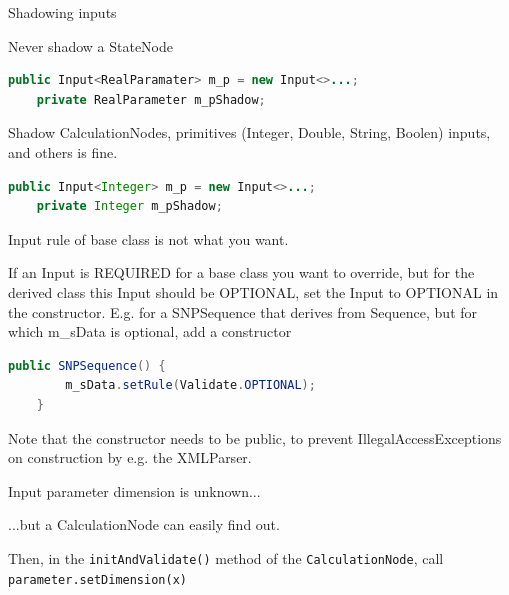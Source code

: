 \documentclass{beamer}
\theoremstyle{definition}
\begin{document}
\begin{frame}[containsverbatim]{Shadowing inputs}

Never shadow a StateNode

\begin{lstlisting}[language=java]
    public Input<RealParamater> m_p = new Input<>...;
    private RealParameter m_pShadow;
\end{lstlisting}


Shadow CalculationNodes, 
primitives (Integer, Double, String, Boolen) inputs, 
and others is fine.


\begin{lstlisting}[language=java]
    public Input<Integer> m_p = new Input<>...;
    private Integer m_pShadow;
\end{lstlisting}


\end{frame}
\fi

\begin{frame}[containsverbatim]{Input rule of base class is not what you want.}

If an Input is REQUIRED for a base class you want to override, but for the derived
class this Input should be OPTIONAL, set the Input to OPTIONAL in the constructor.
E.g. for a SNPSequence that derives from Sequence, but for which m\_sData is optional,
add a constructor

{\color{blue}\begin{lstlisting}[language=java]
	public SNPSequence() {
		m_sData.setRule(Validate.OPTIONAL);
	}
\end{lstlisting}}
Note that the constructor needs to be public, to prevent IllegalAccessExceptions
on construction by e.g. the XMLParser.

\end{frame}

\begin{frame}[containsverbatim]{Input parameter dimension is unknown...}

...but a CalculationNode can easily find out.\vskip 0.5cm

Then, in the {\tt initAndValidate()} method of the {\tt CalculationNode},
call {\tt parameter.setDimension(x)}


\end{frame}
\end{document}
